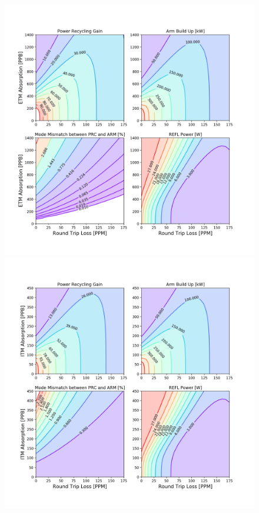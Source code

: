 \begin{figure}[t!]
{	 	}
	 	\label{fig:3d_HWS_plot}
	 \end{figure}

	\begin{figure}
		\centering
		\begin{minipage}{0.5\textheight}
			\centering
			\includegraphics[height=0.5 \textheight]{../Figures/Simplified_PRC_ARM_etm_abs.png}
		\end{minipage}\hfill
		\begin{minipage}{0.5\textheight}
			\centering
			\includegraphics[height=0.5 \textheight]{../Figures/Simplified_PRC_ARM_itm_abs.png}

\end{minipage}
\end{figure}
